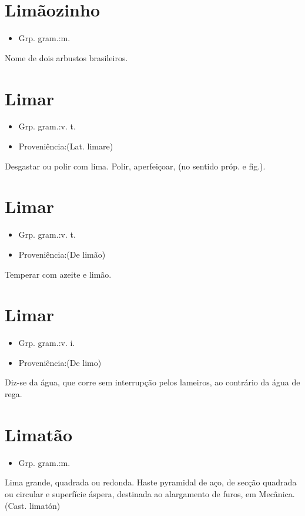 \section{Limãozinho}
\begin{itemize}
\item {Grp. gram.:m.}
\end{itemize}
Nome de dois arbustos brasileiros.
\section{Limar}
\begin{itemize}
\item {Grp. gram.:v. t.}
\end{itemize}
\begin{itemize}
\item {Proveniência:(Lat. \textunderscore limare\textunderscore )}
\end{itemize}
Desgastar ou polir com lima.
Polir, aperfeiçoar, (no sentido próp. e fig.).
\section{Limar}
\begin{itemize}
\item {Grp. gram.:v. t.}
\end{itemize}
\begin{itemize}
\item {Proveniência:(De \textunderscore limão\textunderscore )}
\end{itemize}
Temperar com azeite e limão.
\section{Limar}
\begin{itemize}
\item {Grp. gram.:v. i.}
\end{itemize}
\begin{itemize}
\item {Proveniência:(De \textunderscore limo\textunderscore )}
\end{itemize}
Diz-se da água, que corre sem interrupção pelos lameiros, ao contrário da água de rega.
\section{Limatão}
\begin{itemize}
\item {Grp. gram.:m.}
\end{itemize}
Lima grande, quadrada ou redonda.
Haste pyramidal de aço, de secção quadrada ou circular e superfície áspera, destinada ao alargamento de furos, em Mecânica.
(Cast. \textunderscore limatón\textunderscore )
